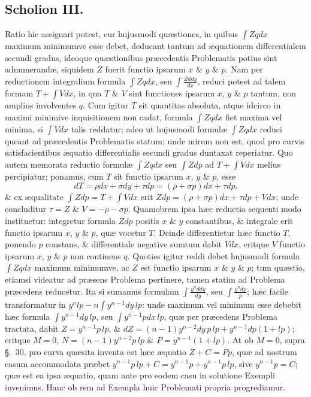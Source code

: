 \subsection*{Scholion III.}
Ratio hic assignari potest, cur hujusmodi quæstiones, in quibus $\int Zqdx$ maximum minimumve esse debet, deducant tantum ad æquationem differentialem secundi gradus, ideoque quæstionibus præcedentis Problematis potius sint adnumerandæ, siquidem $Z$ fuerit functio ipsarum $x$ \& $y$ \& $p$. Nam per reductionem integralium formula $\int Zqdx$, seu $\int\frac{Zddy}{dx}$, reduci potest ad talem formam $T+\int Vdx$, in qua $T$ \& $V$ sint functiones ipsarum $x$, $y$ \& $p$ tantum, non amplius involventes $q$. Cum igitur $T$ sit quantitas absoluta, atque idcirco in maximi minimive inquisitionem non cadat, formula $\int Zqdx$ fiet maxima vel minima, si $\int Vdx$ talis reddatur; adeo ut hujusmodi formulæ $\int Zqdx$ reduci queant ad præcedentis Problematis statum; unde mirum non est, quod pro curvis satisfacientibus æquatio differentialis secundi gradus duntaxat reperiatur. Quo autem memorata reductio formulæ $\int Zqdx$ seu $\int Zdp$ ad $T+\int Vdx$ melius percipiatur; ponamus, cum $T$ sit functio ipsarum $x$, $y$ \& $p$, esse
\[
dT=\rho dx+\sigma dy+\tau dp=(\rho+\sigma p)dx+\tau dp.
\]
\& ex æqualitate $\int Zdp=T+\int Vdx$ erit $Zdp=(\rho+\sigma p)dx+\tau dp+Vdx$; unde concluditur $\tau=Z$ \& $V=-\rho-\sigma p$. Quamobrem ipsa hæc reductio sequenti modo instituetur: integretur formula $Zdp$ positis $x$ \& $y$ constantibus, \& integrale erit functio ipsarum $x$, $y$ \& $p$, quæ vocetur $T$. Deinde differentietur hæc functio $T$, ponendo $p$ constans, \& differentiale negative sumtum dabit $Vdx$, eritque $V$ functio ipsarum $x$, $y$ \& $p$ non continens $q$. Quoties igitur reddi debet hujusmodi formula $\int Zqdx$ maximum minimumve, ac $Z$ est functio ipsarum $x$ \& $y$ \& $p$; tum quæstio, etiamsi videatur ad præsens Problema pertinere, tamen statim ad Problema præcedens reducetur. Ita si sumamus formulam $\int\frac{y^n ddy}{dy}$, seu $\int\frac{y^n dp}{p}$; hæc facile transformatur in $y^n lp-n\int y^{n-1}dy\,lp$: unde maximum vel minimum esse debebit hæc formula $\int y^{n-1}dy\,lp$, seu $\int y^{n-1}pdx\,lp$, quæ per præcedens Problema tractata, dabit $Z=y^{n-1}p\,lp$, \& $dZ=(n-1)y^{n-2}dy\,p\,lp+y^{n-1}dp(1+lp)$; eritque $M=0$, $N=(n-1)y^{n-2}p\,lp$ \& $P=y^{n-1}(1+lp)$. At ob $M=0$, supra §.~30. pro curva quæsita inventa est hæc æquatio $Z+C=Pp$, quæ ad nostrum casum accommodata præbet $y^{n-1}p\,lp+C=y^{n-1}p+y^{n-1}p\,lp$, sive $y^{n-1}p=C$; quæ est ea ipsa æquatio, quam ante pro eodem casu in solutione Exempli invenimus. Hanc ob rem ad Exempla huic Problemati propria progrediamur.


